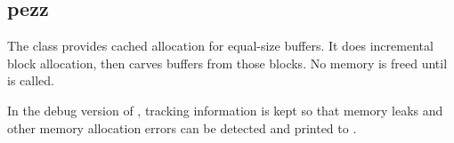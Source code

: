 %
%
%
%
%              

\subsection{pezz}
\label{pezz}

The  class provides cached allocation for equal-size buffers.
It does incremental block allocation, then carves buffers from those blocks.  No
memory is freed until  is called.

In the debug version of , tracking information is kept so that
memory leaks and other memory allocation errors can be detected and printed to
.

